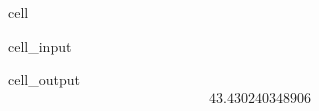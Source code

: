 \documentclass[letterpaper,10pt,english]{jupyterBook}
\begin{document}
\begin{sphinxuseclass}{cell}\begin{sphinxVerbatimInput}

\begin{sphinxuseclass}{cell_input}
\begin{sphinxVerbatim}[commandchars=\\\{\}]


\end{sphinxVerbatim}

\end{sphinxuseclass}\end{sphinxVerbatimInput}
\begin{sphinxVerbatimOutput}

\begin{sphinxuseclass}{cell_output}\begin{equation*}
\begin{split}43.430240348906\end{split}
\end{equation*}
\end{sphinxuseclass}\end{sphinxVerbatimOutput}

\end{sphinxuseclass}
\end{document}
